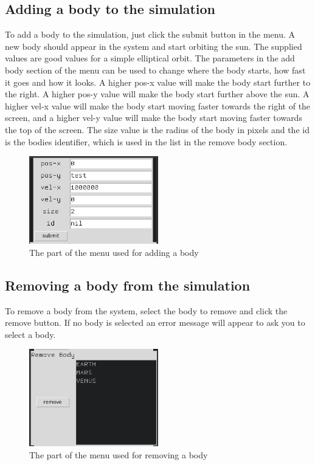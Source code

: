 \documentclass[a4paper,11pt,titlepage]{article}
\begin{document}
\subsection{Adding a body to the simulation}
To add a body to the simulation, just click the submit button in the menu. A new
body should appear in the system and start  orbiting the sun. The supplied
values are good values for a simple elliptical orbit. The parameters in the add
body section of the menu can be used to change where the body starts, how fast
it goes and how it looks. A higher pos-x value will make the body start further
to the right. A higher pos-y value will make the body start further above the
sun. A higher vel-x value will make the body start moving faster towards the
right of the screen, and a higher vel-y value will make the body start moving
faster towards the top of the screen. The size value is the radius of the body
in pixels and the id is the bodies identifier, which is used in the list in the
remove body section.
\begin{figure}[H]
	\centering
	\includegraphics[width=0.5\textwidth]{../img/addman.png}
	\caption{The part of the menu used for adding a body}
\end{figure}

\subsection{Removing a body from the simulation}
To remove a body from the system, select the body to remove and click the remove
button. If no body is selected an error message will appear to ask you to select
a body.
\begin{figure}[H]
	\centering
	\includegraphics[width=0.5\textwidth]{../img/remove.png}
	\caption{The part of the menu used for removing a body}
\end{figure}
\end{document}
